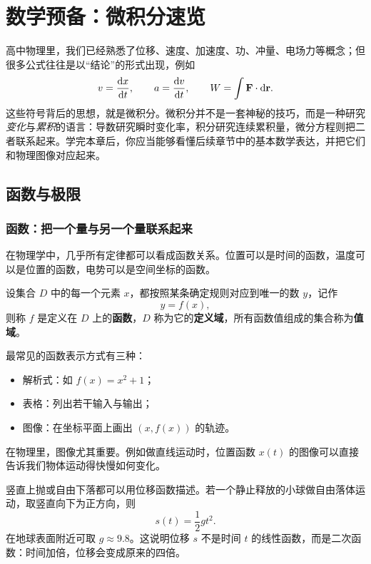 \chapter{数学预备：微积分速览}

高中物理里，我们已经熟悉了位移、速度、加速度、功、冲量、电场力等概念；但很多公式往往是以“结论”的形式出现，例如
\[
  v = \dv{x}{t}, \qquad a = \dv{v}{t}, \qquad W = \int \vb{F} \cdot \dd \vb{r}.
\]
这些符号背后的思想，就是微积分。微积分并不是一套神秘的技巧，而是一种研究\emph{变化}与\emph{累积}的语言：导数研究瞬时变化率，积分研究连续累积量，微分方程则把二者联系起来。学完本章后，你应当能够看懂后续章节中的基本数学表达，并把它们和物理图像对应起来。

\section{函数与极限}

\subsection{函数：把一个量与另一个量联系起来}

在物理学中，几乎所有定律都可以看成函数关系。位置可以是时间的函数，温度可以是位置的函数，电势可以是空间坐标的函数。

\begin{definition}
设集合 $D$ 中的每一个元素 $x$，都按照某条确定规则对应到唯一的数 $y$，记作
\[
  y = f(x),
\]
则称 $f$ 是定义在 $D$ 上的\textbf{函数}，$D$ 称为它的\textbf{定义域}，所有函数值组成的集合称为\textbf{值域}。
\end{definition}

最常见的函数表示方式有三种：
\begin{itemize}
  \item 解析式：如 $f(x) = x^2 + 1$；
  \item 表格：列出若干输入与输出；
  \item 图像：在坐标平面上画出 $(x, f(x))$ 的轨迹。
\end{itemize}

在物理里，图像尤其重要。例如做直线运动时，位置函数 $x(t)$ 的图像可以直接告诉我们物体运动得快慢如何变化。

\begin{example}
竖直上抛或自由下落都可以用位移函数描述。若一个静止释放的小球做自由落体运动，取竖直向下为正方向，则
\[
  s(t) = \frac{1}{2}gt^2.
\]
在地球表面附近可取 $g \approx 9.8$。这说明位移 $s$ 不是时间 $t$ 的线性函数，而是二次函数：时间加倍，位移会变成原来的四倍。
\end{example}

